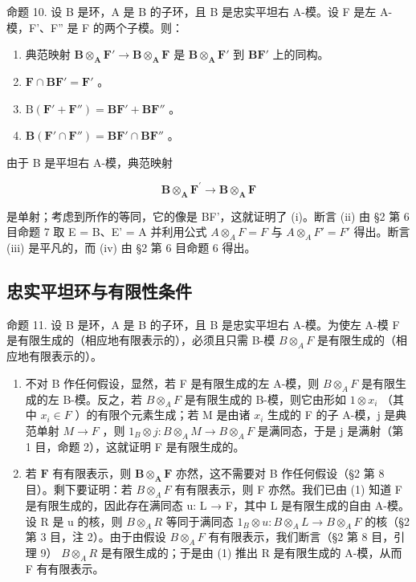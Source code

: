 命题 10. 设 B 是环，A 是 B 的子环，且 B 是忠实平坦右 A-模。设 F 是左 A-模，F'、F'' 是 F 的两个子模。则：

\begin{enumerate}
\def\labelenumi{(\roman{enumi})}
\item
  典范映射 \(\mathbf{B} \otimes_{\mathbf{A}} \mathbf{F}' \to \mathbf{B} \otimes_{\mathbf{A}} \mathbf{F}\) 是 \(\mathbf{B} \otimes_{\mathbf{A}} \mathbf{F}'\) 到 \(\mathbf{BF}'\) 上的同构。
\item
  \(\mathbf{F} \cap \mathbf{BF}' = \mathbf{F}'\) 。
\item
  \(\mathrm{B}(\mathbf{F}' + \mathbf{F}'') = \mathbf{BF}' + \mathbf{BF}''\) 。
\item
  \(\mathbf{B}(\mathbf{F}'\cap \mathbf{F}'')=\mathbf{B}\mathbf{F}'\cap \mathbf{B}\mathbf{F}''\) 。
\end{enumerate}

由于 B 是平坦右 A-模，典范映射

\[
\mathbf {B} \otimes_ {\mathbf {A}} \mathbf {F} ^ {\prime} \rightarrow \mathbf {B} \otimes_ {\mathbf {A}} \mathbf {F}
\]

是单射；考虑到所作的等同，它的像是 BF'，这就证明了 (i)。断言 (ii) 由 §2 第 6 目命题 7 取 E = B、E' = A 并利用公式 \(A \otimes_{A} F = F\) 与 \(A \otimes_{A} F' = F'\) 得出。断言 (iii) 是平凡的，而 (iv) 由 §2 第 6 目命题 6 得出。

\subsection{忠实平坦环与有限性条件}

命题 11. 设 B 是环，A 是 B 的子环，且 B 是忠实平坦右 A-模。为使左 A-模 F 是有限生成的（相应地有限表示的），必须且只需 B-模 \(B \otimes_{A} F\) 是有限生成的（相应地有限表示的）。

\begin{enumerate}
\def\labelenumi{(\arabic{enumi})}
\item
  不对 B 作任何假设，显然，若 F 是有限生成的左 A-模，则 \(B \otimes_{A} F\) 是有限生成的左 B-模。反之，若 \(B \otimes_{A} F\) 是有限生成的 B-模，则它由形如 \(1 \otimes x_{i}\) （其中 \(x_{i} \in F\) ）的有限个元素生成；若 M 是由诸 \(x_{i}\) 生成的 F 的子 A-模，j 是典范单射 \(M \to F\) ，则 \(1_{B} \otimes j: B \otimes_{A} M \to B \otimes_{A} F\) 是满同态，于是 j 是满射（第 1 目，命题 2），这就证明 F 是有限生成的。
\item
  若 \(\mathbf{F}\) 有有限表示，则 \(\mathbf{B} \otimes_{\mathbf{A}} \mathbf{F}\) 亦然，这不需要对 B 作任何假设（§2 第 8 目）。剩下要证明：若 \(B \otimes_{A} F\) 有有限表示，则 F 亦然。我们已由 (1) 知道 F 是有限生成的，因此存在满同态 u: L → F，其中 L 是有限生成的自由 A-模。设 R 是 u 的核，则 \(B \otimes_{A} R\) 等同于满同态 \(1_{B} \otimes u: B \otimes_{A} L \to B \otimes_{A} F\) 的核（§2 第 3 目，注 2）。由于由假设 \(B \otimes_{A} F\) 有有限表示，我们断言（§2 第 8 目，引理 9） \(B \otimes_{A} R\) 是有限生成的；于是由 (1) 推出 R 是有限生成的 A-模，从而 F 有有限表示。
\end{enumerate}


